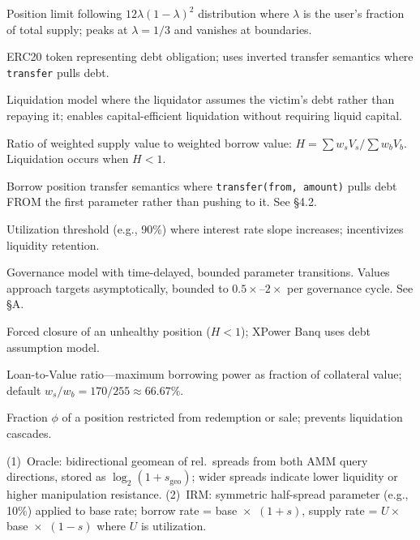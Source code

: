 \documentclass[10pt,a4paper,twocolumn]{article}
\begin{document}
\begin{description}[leftmargin=!,labelwidth=2.5cm]
    \item[Beta Cap] Position limit following \mbox{$12\lambda(1-\lambda)^2$} distribution where $\lambda$ is the user's fraction of total supply; peaks at $\lambda = 1/3$ and vanishes at boundaries.

    \item[Borrow Position] ERC20 token representing debt obligation; uses inverted transfer semantics where \texttt{transfer} pulls debt.

    \item[Debt Assumption] Liquidation model where the liquidator assumes the victim's debt rather than repaying it; enables capital-efficient liquidation without requiring liquid capital.

    \item[Health Factor] Ratio of weighted supply value to weighted borrow value: $H = \sum w_s V_s / \sum w_b V_b$. Liquidation occurs when $H < 1$.

    \item[Inverted Transfer] Borrow position transfer semantics where \texttt{transfer(from, amount)} pulls debt FROM the first parameter rather than pushing to it. See \S4.2.

    \item[Kink] Utilization threshold (e.g., 90\%) where interest rate slope increases; incentivizes liquidity retention.

    \item[Lethargic Governance] Governance model with time-delayed, bounded parameter transitions. Values approach targets asymptotically, bounded to $0.5\times$--$2\times$ per governance cycle. See \S A.

    \item[Liquidation] Forced closure of an unhealthy position ($H < 1$); XPower Banq uses debt assumption model.

    \item[LTV] Loan-to-Value ratio---maximum borrowing power as fraction of collateral value; default $w_s/w_b = 170/255 \approx 66.67\%$.

    \item[Position Lock] Fraction $\phi$ of a position restricted from redemption or sale; prevents liquidation cascades.

    \item[Spread] (1)~Oracle: bidirectional geomean of rel.\ spreads from both AMM query directions, stored as $\log_2(1 + s_{\text{geo}})$; wider spreads indicate lower liquidity or higher manipulation resistance. (2)~IRM: symmetric half-spread parameter (e.g., 10\%) applied to base rate; borrow rate = base~$\times$~$(1{+}s)$, supply rate = $U \times$ base~$\times$~$(1{-}s)$ where $U$ is utilization.


\end{description}
\end{document}
